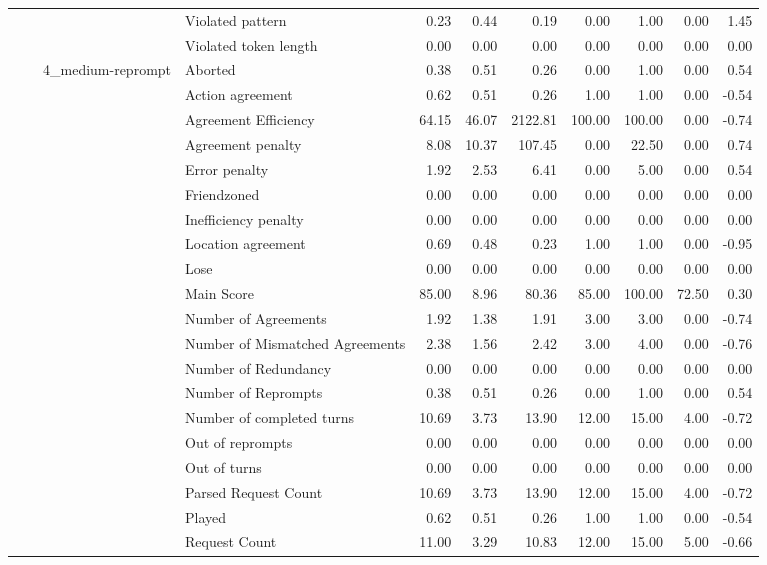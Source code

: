 \begin{tabular}{llllrrrrrrr}
 &  &  & Violated pattern & 0.23 & 0.44 & 0.19 & 0.00 & 1.00 & 0.00 & 1.45 \\
 &  &  & Violated token length & 0.00 & 0.00 & 0.00 & 0.00 & 0.00 & 0.00 & 0.00 \\
\cline{3-11}
 &  & \multirow[t]{27}{*}{4_medium-reprompt} & Aborted & 0.38 & 0.51 & 0.26 & 0.00 & 1.00 & 0.00 & 0.54 \\
 &  &  & Action agreement & 0.62 & 0.51 & 0.26 & 1.00 & 1.00 & 0.00 & -0.54 \\
 &  &  & Agreement Efficiency & 64.15 & 46.07 & 2122.81 & 100.00 & 100.00 & 0.00 & -0.74 \\
 &  &  & Agreement penalty & 8.08 & 10.37 & 107.45 & 0.00 & 22.50 & 0.00 & 0.74 \\
 &  &  & Error penalty & 1.92 & 2.53 & 6.41 & 0.00 & 5.00 & 0.00 & 0.54 \\
 &  &  & Friendzoned & 0.00 & 0.00 & 0.00 & 0.00 & 0.00 & 0.00 & 0.00 \\
 &  &  & Inefficiency penalty & 0.00 & 0.00 & 0.00 & 0.00 & 0.00 & 0.00 & 0.00 \\
 &  &  & Location agreement & 0.69 & 0.48 & 0.23 & 1.00 & 1.00 & 0.00 & -0.95 \\
 &  &  & Lose & 0.00 & 0.00 & 0.00 & 0.00 & 0.00 & 0.00 & 0.00 \\
 &  &  & Main Score & 85.00 & 8.96 & 80.36 & 85.00 & 100.00 & 72.50 & 0.30 \\
 &  &  & Number of Agreements & 1.92 & 1.38 & 1.91 & 3.00 & 3.00 & 0.00 & -0.74 \\
 &  &  & Number of Mismatched Agreements & 2.38 & 1.56 & 2.42 & 3.00 & 4.00 & 0.00 & -0.76 \\
 &  &  & Number of Redundancy & 0.00 & 0.00 & 0.00 & 0.00 & 0.00 & 0.00 & 0.00 \\
 &  &  & Number of Reprompts & 0.38 & 0.51 & 0.26 & 0.00 & 1.00 & 0.00 & 0.54 \\
 &  &  & Number of completed turns & 10.69 & 3.73 & 13.90 & 12.00 & 15.00 & 4.00 & -0.72 \\
 &  &  & Out of reprompts & 0.00 & 0.00 & 0.00 & 0.00 & 0.00 & 0.00 & 0.00 \\
 &  &  & Out of turns & 0.00 & 0.00 & 0.00 & 0.00 & 0.00 & 0.00 & 0.00 \\
 &  &  & Parsed Request Count & 10.69 & 3.73 & 13.90 & 12.00 & 15.00 & 4.00 & -0.72 \\
 &  &  & Played & 0.62 & 0.51 & 0.26 & 1.00 & 1.00 & 0.00 & -0.54 \\
 &  &  & Request Count & 11.00 & 3.29 & 10.83 & 12.00 & 15.00 & 5.00 & -0.66 \\

\end{tabular}
